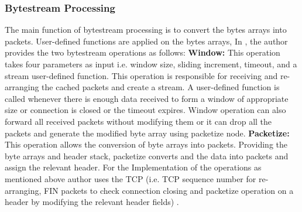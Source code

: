 \documentclass[10pt, a4paper, conference]{IEEEtran}
\begin{document}
\subsubsection{Bytestream Processing}
The main function of bytestream processing is to convert the bytes arrays into packets. User-defined functions are applied on the bytes arrays, In \cite{Panda2016}, the author provides the two bytestream operations as follows: 
\newline
\textbf{Window:} This operation takes four parameters as input i.e. window size, sliding increment, timeout, and a stream user-defined function. This operation is responsible for receiving and re-arranging the cached packets and create a stream. A user-defined function is called whenever there is enough data received to form a window of appropriate size or connection is closed or the timeout expires. Window operation can also forward all received packets without modifying them or it can drop all the packets and generate the modified byte array using packetize node. 
\newline
\textbf{Packetize:} This operation allows the conversion of byte arrays into packets. Providing the byte arrays and header stack, packetize converts and the data into packets and assign the relevant header.  For the Implementation of the operations as mentioned above author uses the TCP (i.e. TCP sequence number for re-arranging, FIN packets to check connection closing and packetize operation on a header by modifying the relevant header fields) \cite{Panda2016}.
\end{document}
